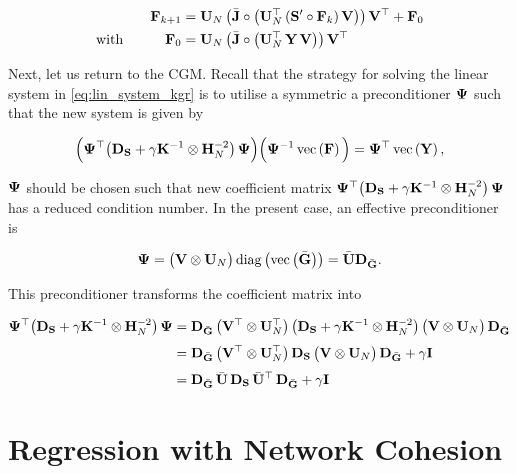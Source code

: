 \begin{align}
    \label{eq:update_sim_kgr}
    \mathbf{F}_{k+1} & = \mathbf{U}_N \, \big( \bar{\mathbf{J}}  \circ \big( \mathbf{U}_N^\top \, (\mathbf{S}' \circ \mathbf{F}_{k})\, \mathbf{V} \big) \big) \, \mathbf{V}^\top + \mathbf{F}_0 \\
    \label{eq:update_sim_kgr2}
    \text{with} \quad\quad\quad \mathbf{F}_0 & = \mathbf{U}_N \, \big( \bar{\mathbf{J}}  \circ \big( \mathbf{U}_N^\top \, \mathbf{Y} \, \mathbf{V} \big) \big) \, \mathbf{V}^\top 
\end{align}


Next, let us return to the CGM. Recall that the strategy for solving the linear system in \cref{eq:lin_system_kgr} is to utilise a symmetric a preconditioner $\mathbf{\Psi}$ such that the new system is given by 

\begin{equation}
    \Big(\mathbf{\Psi}^\top  \big(\mathbf{D}_{\mathbf{S}} + \gamma \mathbf{K}^{-1} \otimes \mathbf{H}_N^{-2} \big) \, \mathbf{\Psi}  \Big) \Big(\mathbf{\Psi}^{-1}\, \text{\textup{vec}}\left( \mathbf{F} \right) \Big) = \mathbf{\Psi}^\top \, \text{\textup{vec}}\left(\mathbf{Y}\right),
\end{equation}

$\mathbf{\Psi}$ should be chosen such that new coefficient matrix $\mathbf{\Psi}^\top \big(\mathbf{D}_{\mathbf{S}} + \gamma \mathbf{K}^{-1} \otimes \mathbf{H}_N^{-2} \big) \, \mathbf{\Psi}$ has a reduced condition number. In the present case, an effective preconditioner is 

\begin{equation}
    \mathbf{\Psi} = \big(\mathbf{V} \otimes \mathbf{U}_N \big) \, \text{\textup{diag}}\left(\text{\textup{vec}}\left(\bar{\mathbf{G}}\right)\right) = \bar{\mathbf{U}} \mathbf{D}_{\bar{\mathbf{G}}}.
\end{equation}

This preconditioner transforms the coefficient matrix into 

\begin{align*}
    \mathbf{\Psi}^\top \big(\mathbf{D}_{\mathbf{S}} + \gamma \mathbf{K}^{-1} \otimes \mathbf{H}_N^{-2} \big) \, \mathbf{\Psi}  &= \mathbf{D}_{\bar{\mathbf{G}}} \, \big(\mathbf{V}^\top \otimes \mathbf{U}_N^\top \big) \, \big(\mathbf{D}_{\mathbf{S}} + \gamma \mathbf{K}^{-1} \otimes \mathbf{H}_N^{-2} \big) \,  \big(\mathbf{V} \otimes \mathbf{U}_N \big) \, \mathbf{D}_{\bar{\mathbf{G}}}   \\[0.1cm]
    &= \mathbf{D}_{\bar{\mathbf{G}}} \, \big(\mathbf{V}^\top \otimes \mathbf{U}_N^\top \big) \, \mathbf{D}_{\mathbf{S}} \, \big(\mathbf{V} \otimes \mathbf{U}_N \big) \, \mathbf{D}_{\bar{\mathbf{G}}} + \gamma \mathbf{I} \\[0.1cm]
    &= \mathbf{D}_{\bar{\mathbf{G}}} \, \bar{\mathbf{U}} \, \mathbf{D}_{\mathbf{S}} \, \bar{\mathbf{U}}^\top \, \mathbf{D}_{\bar{\mathbf{G}}} + \gamma \mathbf{I} 
\end{align*}


\section{Regression with Network Cohesion}

\label{sec:rnc_mdp}

